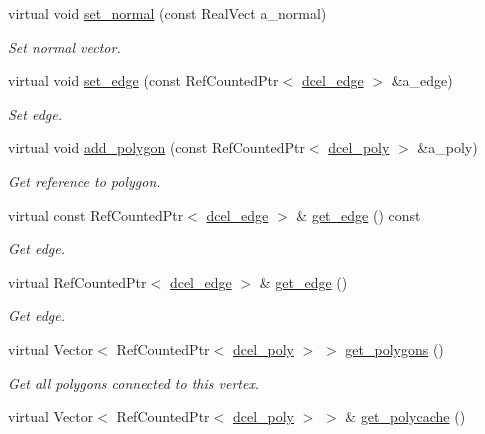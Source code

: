 \begin{DoxyCompactItemize}
virtual void \hyperlink{classdcel__vert_a0c9196610d07d3cc518419cb6c4c6757}{set\+\_\+normal} (const Real\+Vect a\+\_\+normal)
\begin{DoxyCompactList}\small\item\em Set normal vector. \end{DoxyCompactList}\item 
virtual void \hyperlink{classdcel__vert_a293c384d1d732a7021f63122db60bdb4}{set\+\_\+edge} (const Ref\+Counted\+Ptr$<$ \hyperlink{classdcel__edge}{dcel\+\_\+edge} $>$ \&a\+\_\+edge)
\begin{DoxyCompactList}\small\item\em Set edge. \end{DoxyCompactList}\item 
virtual void \hyperlink{classdcel__vert_ac517476a6fa4083f639fa8a6819cf742}{add\+\_\+polygon} (const Ref\+Counted\+Ptr$<$ \hyperlink{classdcel__poly}{dcel\+\_\+poly} $>$ \&a\+\_\+poly)
\begin{DoxyCompactList}\small\item\em Get reference to polygon. \end{DoxyCompactList}\item 
virtual const Ref\+Counted\+Ptr$<$ \hyperlink{classdcel__edge}{dcel\+\_\+edge} $>$ \& \hyperlink{classdcel__vert_a85b6a47e012095743df181ace2352a90}{get\+\_\+edge} () const 
\begin{DoxyCompactList}\small\item\em Get edge. \end{DoxyCompactList}\item 
virtual Ref\+Counted\+Ptr$<$ \hyperlink{classdcel__edge}{dcel\+\_\+edge} $>$ \& \hyperlink{classdcel__vert_a8f8328043fb4ee193912739b04f2741e}{get\+\_\+edge} ()
\begin{DoxyCompactList}\small\item\em Get edge. \end{DoxyCompactList}\item 
virtual Vector$<$ Ref\+Counted\+Ptr$<$ \hyperlink{classdcel__poly}{dcel\+\_\+poly} $>$ $>$ \hyperlink{classdcel__vert_a56f3c2f186cf0df3203ae3c700552fff}{get\+\_\+polygons} ()
\begin{DoxyCompactList}\small\item\em Get all polygons connected to this vertex. \end{DoxyCompactList}\item 
virtual Vector$<$ Ref\+Counted\+Ptr$<$ \hyperlink{classdcel__poly}{dcel\+\_\+poly} $>$ $>$ \& \hyperlink{classdcel__vert_aee6c78b5852316cff9d12ccf583b67e2}{get\+\_\+polycache} ()

\end{DoxyCompactItemize}
